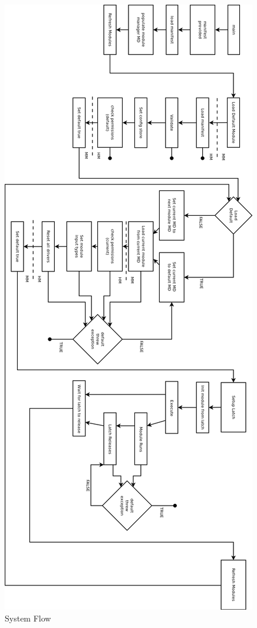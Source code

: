 \documentclass[11pt,letterpaper]{article}
\begin{document}
	\begin{figure}[h!]
		\caption{System Flow}
		\centering
		\includegraphics[height=0.9\textheight]{flow_diagram}
	\end{figure}
	\pagebreak
\end{document}
